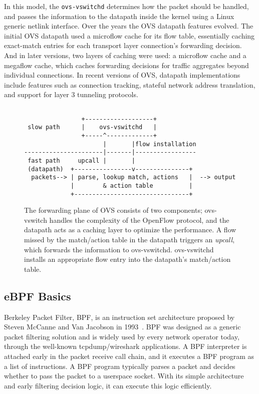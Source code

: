 \documentclass[10pt]{sigplanconf}
\begin{document}
In this model, the \verb+ovs-vswitchd+ determines how the packet should be handled,
and passes the information to the datapath inside the kernel using a
Linux generic netlink interface.  Over the years the OVS datapath features evolved.
The initial OVS datapath used a microflow cache for its flow table,
essentially caching exact-match entries for each
transport layer connection's forwarding decision.  And in later versions,
two layers of caching were used: a microflow cache and a megaflow cache,
which caches forwarding decisions for traffic aggregates beyond individual
connections.  In recent versions of OVS, datapath implementations include
features such as connection tracking, stateful network address translation, and
support for layer 3 tunneling protocols.

\begin{figure}
{\scriptsize
\begin{verbatim}
              
                +-------------------+
 slow path      |    ovs-vswitchd   |
                +-----^-------------+
                      |       |flow installation
----------------------|-------|-----------------
 fast path     upcall |       | 
 (datapath)  +----------------v---------------+ 
  packets--> | parse, lookup match, actions   |  --> output
             |        & action table          |
             +--------------------------------+
\end{verbatim}
}
\vspace{-1.0em}
\caption{
The forwarding plane of OVS consists of two components;
ovs-vswitch handles the complexity of the OpenFlow protocol, and the
datapath acts as a caching layer to optimize the performance.  A flow
missed by the match/action table in the datapath triggers an {\em
upcall}, which forwards the information to ovs-vswitchd.  ovs-vswitchd
installs an appropriate flow entry into the datapath's match/action table.}
\label{ovsintro}
\vspace{-1.0em}
\end{figure}

\subsection{eBPF Basics}\label{sec:ebpf}
Berkeley Packet Filter, BPF, is an instruction set architecture
proposed by Steven McCanne and Van Jacobson in 1993~\cite{cbpf}.  
BPF was designed as a generic packet filtering solution and is widely
used by every network operator today, through the well-known tcpdump/wireshark
applications. A BPF interpreter is attached early in the packet receive call
chain, and it executes a BPF program as a list of instructions.
A BPF program typically parses a packet and decides
whether to pass the packet to a userspace socket.  With its simple architecture
and early filtering decision logic, it can execute this logic efficiently.
\end{document}
